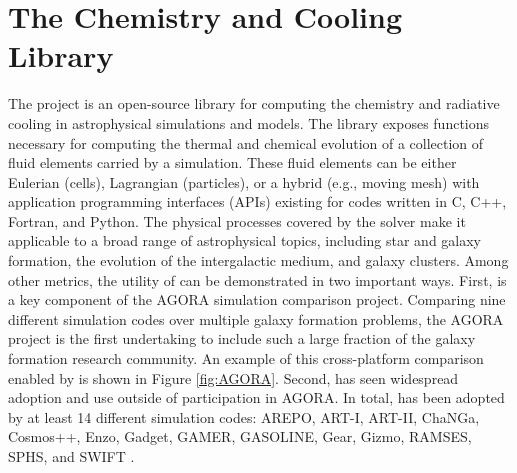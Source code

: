 \section{The \grackle{} Chemistry and Cooling Library}

The \grackle{} project
\citep[][\url{https://grackle.readthedocs.io}]{2017MNRAS.466.2217S} is
an open-source library for computing the chemistry and radiative
cooling in astrophysical simulations and models.  The
\grackle{} library exposes functions necessary for computing the
thermal and chemical evolution of a collection of fluid elements carried by a
simulation.  These fluid elements can be either Eulerian (cells),
Lagrangian (particles), or a hybrid (e.g., moving mesh) with
application programming interfaces (APIs)
existing for codes written in C, C++, Fortran, and Python.  The
physical processes covered by the solver make it applicable to a broad
range of astrophysical topics, including star and galaxy formation, the
evolution of the intergalactic medium, and galaxy clusters.  Among
other metrics, the utility of \grackle{} can be demonstrated in two
important ways.  First, \grackle{} is a key component of the AGORA
\citep{2014ApJS..210...14K, 2016ApJ...833..202K} simulation comparison
project.  Comparing nine different simulation codes over multiple
galaxy formation problems, the AGORA project is the first
undertaking to include such a large fraction of the galaxy formation research
community.  An example of this cross-platform comparison enabled by
\grackle{} is shown in Figure \ref{fig:AGORA}.  Second, \grackle{} has
seen widespread adoption and use outside of participation in AGORA.
In total, \grackle{} has been adopted by at least 14 different
simulation codes:
AREPO, ART-I, ART-II, ChaNGa, Cosmos++, Enzo, Gadget, GAMER, GASOLINE, Gear,
Gizmo, RAMSES, SPHS, and SWIFT
\citep{2010MNRAS.401..791S, 1999PhDT........25K, 2002ApJ...571..563K,
2008ApJ...672...19R, 2004NewA....9..137W, 2006MNRAS.373.1074S,
2003ApJS..147..177A, 2005ApJ...635..723A, 2014ApJS..211...19B,
2005MNRAS.364.1105S, 2010ApJS..186..457S, 2004NewA....9..137W,
2012A&A...538A..82R, 2012ASPC..453..141R, 2015MNRAS.450...53H,
2002A&A...385..337T, 2012MNRAS.422.3037R, 2013arXiv1309.3783G,
2016arXiv160602738S}.

